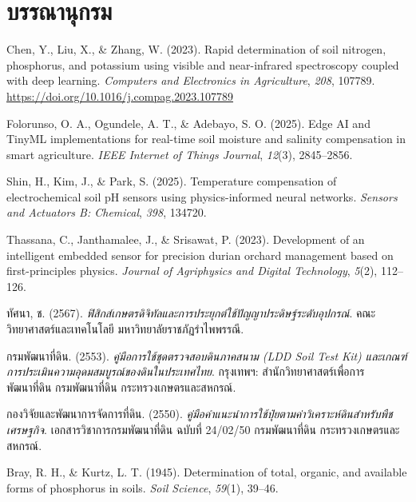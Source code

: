 \chapter*{บรรณานุกรม}

\noindent Chen, Y., Liu, X., \& Zhang, W. (2023). Rapid determination of soil nitrogen, phosphorus, and potassium using visible and near-infrared spectroscopy coupled with deep learning. \textit{Computers and Electronics in Agriculture}, \textit{208}, 107789. \url{https://doi.org/10.1016/j.compag.2023.107789}

\vspace{6pt}
\noindent Folorunso, O. A., Ogundele, A. T., \& Adebayo, S. O. (2025). Edge AI and TinyML implementations for real-time soil moisture and salinity compensation in smart agriculture. \textit{IEEE Internet of Things Journal}, \textit{12}(3), 2845--2856.

\vspace{6pt}
\noindent Shin, H., Kim, J., \& Park, S. (2025). Temperature compensation of electrochemical soil pH sensors using physics-informed neural networks. \textit{Sensors and Actuators B: Chemical}, \textit{398}, 134720.

\vspace{6pt}
\noindent Thassana, C., Janthamalee, J., \& Srisawat, P. (2023). Development of an intelligent embedded sensor for precision durian orchard management based on first-principles physics. \textit{Journal of Agriphysics and Digital Technology}, \textit{5}(2), 112--126.

\vspace{6pt}
\noindent ทัศนา, ช. (2567). \textit{ฟิสิกส์เกษตรดิจิทัลและการประยุกต์ใช้ปัญญาประดิษฐ์ระดับอุปกรณ์}. คณะวิทยาศาสตร์และเทคโนโลยี มหาวิทยาลัยราชภัฏรำไพพรรณี.

\vspace{6pt}
\noindent กรมพัฒนาที่ดิน. (2553). \textit{คู่มือการใช้ชุดตรวจสอบดินภาคสนาม (LDD Soil Test Kit) และเกณฑ์การประเมินความอุดมสมบูรณ์ของดินในประเทศไทย}. กรุงเทพฯ: สำนักวิทยาศาสตร์เพื่อการพัฒนาที่ดิน กรมพัฒนาที่ดิน กระทรวงเกษตรและสหกรณ์.

\vspace{6pt}
\noindent กองวิจัยและพัฒนาการจัดการที่ดิน. (2550). \textit{คู่มือคำแนะนำการใช้ปุ๋ยตามค่าวิเคราะห์ดินสำหรับพืชเศรษฐกิจ}. เอกสารวิชาการกรมพัฒนาที่ดิน ฉบับที่ 24/02/50 กรมพัฒนาที่ดิน กระทรวงเกษตรและสหกรณ์.

\vspace{6pt}
\noindent Bray, R. H., \& Kurtz, L. T. (1945). Determination of total, organic, and available forms of phosphorus in soils. \textit{Soil Science}, \textit{59}(1), 39--46.

